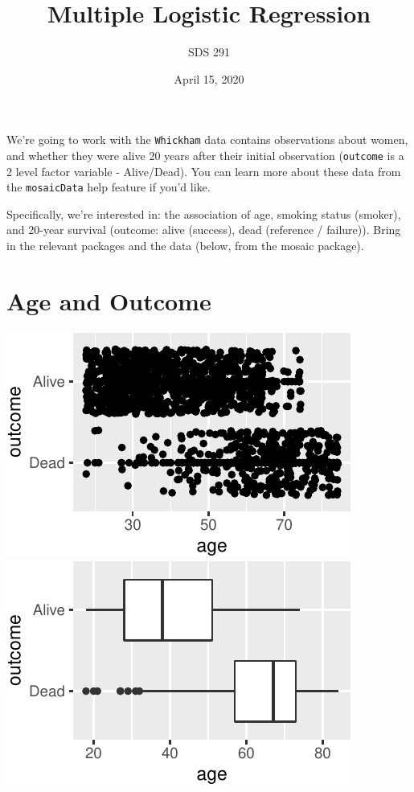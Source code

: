 \documentclass[]{article}
\title{Multiple Logistic Regression}
\author{SDS 291}
\date{April 15, 2020}
\newenvironment{Shaded}{\begin{snugshade}}{\end{snugshade}}
\newcommand{\DataTypeTok}[1]{\textcolor[rgb]{0.13,0.29,0.53}{#1}}
\newcommand{\KeywordTok}[1]{\textcolor[rgb]{0.13,0.29,0.53}{\textbf{#1}}}
\newcommand{\NormalTok}[1]{#1}
\newcommand{\OperatorTok}[1]{\textcolor[rgb]{0.81,0.36,0.00}{\textbf{#1}}}
\newcommand{\StringTok}[1]{\textcolor[rgb]{0.31,0.60,0.02}{#1}}
\begin{document}
\maketitle

We're going to work with the \texttt{Whickham} data contains
observations about women, and whether they were alive 20 years after
their initial observation (\texttt{outcome} is a 2 level factor variable
- Alive/Dead). You can learn more about these data from the
\texttt{mosaicData} help feature if you'd like.

Specifically, we're interested in: the association of age, smoking
status (smoker), and 20-year survival (outcome: alive (success), dead
(reference / failure)). Bring in the relevant packages and the data
(below, from the mosaic package).

\begin{Shaded}
\end{Shaded}

\newpage

\hypertarget{age-and-outcome}{%
\section{Age and Outcome}\label{age-and-outcome}}

\includegraphics{20-inclasslab_files/figure-latex/unnamed-chunk-3-1.pdf}
\includegraphics{20-inclasslab_files/figure-latex/unnamed-chunk-3-2.pdf}
\end{document}
